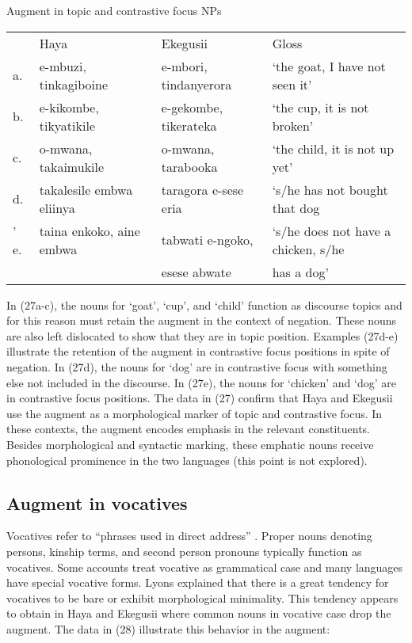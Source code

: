 \documentclass[output=paper]{langscibook}
\begin{document}
\begin{exe}
\ex Augment in topic and contrastive focus NPs\\
\label{hayagusii27}
\begin{tabular}{ p{0.5cm} p{2.5cm} p{2.5cm} p{4cm}}
 & Haya			&	Ekegusii	&	Gloss \\
  a. &	e-mbuzi, tinkagiboine	&	e-mbori, tindanyerora &	‘the goat, I have not seen it’\\   		
b. &	e-kikombe, tikyatikile	&	e-gekombe, tikerateka &	‘the cup, it is not broken’\\
c. &	o-mwana, takaimukile	&	o-mwana, tarabooka &	‘the child, it is not up yet’\\	
d. &	takalesile embwa eliinya &	taragora e-sese	 eria &	‘s/he has not bought that dog\\’
e. &	taina enkoko, aine embwa &	tabwati e-ngoko, &	‘s/he does not have a chicken, s/he  \\    
 & &                                               esese abwate      &         has a dog’\\

\end{tabular}
\end{exe}
In (27a-c), the nouns for ‘goat’, ‘cup’, and ‘child’ function as discourse topics and for this reason must retain the augment in the context of negation. These nouns are also left dislocated to show that they are in topic position. Examples (27d-e) illustrate the retention of the augment in contrastive focus positions in spite of negation. In (27d), the nouns for ‘dog’ are in contrastive focus with something else not included in the discourse. In (27e), the nouns for ‘chicken’ and ‘dog’ are in contrastive focus positions. The data in (27) confirm that Haya and Ekegusii use the augment as a morphological marker of topic and contrastive focus. In these contexts, the augment encodes emphasis in the relevant constituents. Besides morphological and syntactic marking, these emphatic nouns receive phonological prominence in the two languages (this point is not explored).

\subsection{Augment in vocatives}
	Vocatives refer to “phrases used in direct address” \citep[152]{lyons1999definiteness}. Proper nouns denoting persons, kinship terms, and second person pronouns typically function as vocatives. Some accounts treat vocative as grammatical case and many languages have special vocative forms. Lyons explained that there is a great tendency for vocatives to be bare or exhibit morphological minimality. This tendency appears to obtain in Haya and Ekegusii where common nouns in vocative case drop the augment. The data in (28) illustrate this behavior in the augment:
\end{document}
